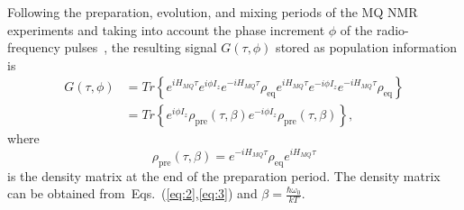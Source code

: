 \documentclass[preprint,12pt]{elsarticle}
\begin{document}
Following the preparation, evolution, and mixing periods of the MQ NMR experiments and taking into account the phase increment $\phi$ of the radio-frequency pulses~\cite{10}, the resulting signal $G(\tau,\phi)$ stored as population information is
%
\begin{equation} \label{eq:4}
	\begin{split}
		G(\tau,\phi)
		& = Tr \left\{
			e^{iH_{MQ}\tau} e^{i\phi I_z} e^{-iH_{MQ}\tau} \rho_\mathrm{eq}
			e^{iH_{MQ}\tau} e^{-i\phi I_z} e^{-iH_{MQ}\tau}\rho_\mathrm{eq}
		\right\}
		\\
		& = Tr \left\{
			e^{i\phi I_z} \rho_\mathrm{pre}(\tau,\beta)
      e^{-i\phi I_z}\rho_\mathrm{pre}(\tau,\beta)
		\right\},
	\end{split}
\end{equation}
%
where
%
\begin{equation} \label{eq:5}
	\rho_\mathrm{pre}(\tau,\beta) = e^{-iH_{MQ}\tau}\rho_\mathrm{eq}e^{iH_{MQ}\tau}
\end{equation}
%
is the density matrix at the end of the preparation period.
The density matrix can be obtained from~Eqs.~(\ref{eq:2},\ref{eq:3}) and $\beta = \frac{\hbar \omega_0}{kT}$.
\end{document}
